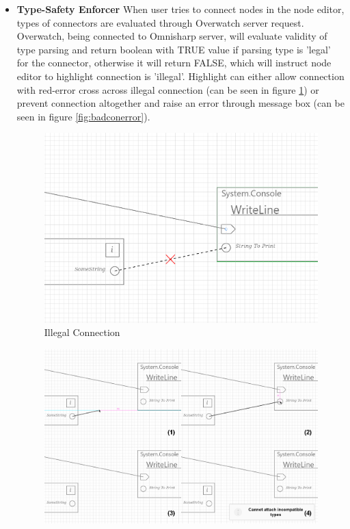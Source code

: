 \documentclass{article}
\begin{document}
\begin{itemize}
    \item \textbf{Type-Safety Enforcer} \newline
          When user tries to connect nodes in the node editor, types of connectors are evaluated through Overwatch server request. Overwatch, being connected to Omnisharp server, will evaluate validity of type parsing and return boolean with TRUE value if parsing type is 'legal' for the connector, otherwise it will return FALSE, which will instruct node editor to highlight connection is 'illegal'. Highlight can either allow connection with red-error cross across illegal connection (can be seen in figure \ref{fig:badcon}) or prevent connection altogether and raise an error through message box (can be seen in figure \ref{fig:badconerror}).
          \begin{figure}[H]
              \centering
              \includegraphics[width=1\textwidth]{illegalmove_cross.PNG}
              \caption{Illegal Connection}
              \label{fig:badcon}
          \end{figure}
          \begin{figure}[H]
              \centering
              \includegraphics[width=1\textwidth]{illegalmove_message.png}

\end{figure}
\end{itemize}
\end{document}
